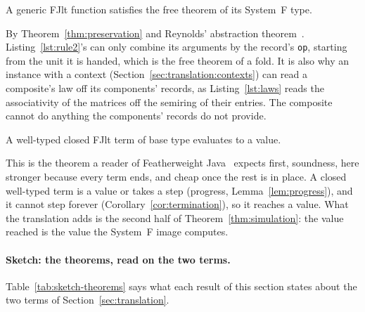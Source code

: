 \begin{corollary}[Parametricity]
\label{cor:parametricity}
A generic FJlt function satisfies the free theorem of its System~F type.
\end{corollary}

By Theorem~\ref{thm:preservation} and Reynolds' abstraction theorem~\cite{reynolds1983types,wadler1989theorems}.
Listing~\ref{lst:rule2}'s  can only combine its arguments by the record's \texttt{op}, starting from the unit it is handed, which is the free theorem of a fold.
It is also why an instance with a context (Section~\ref{sec:translation:contexts}) can read a composite's law off its components' records, as Listing~\ref{lst:laws} reads the associativity of the matrices off the semiring of their entries.
The composite cannot do anything the components' records do not provide.

\begin{corollary}
\label{cor:soundness}
A well-typed closed FJlt term of base type evaluates to a value.
\end{corollary}

This is the theorem a reader of Featherweight Java~\cite{igarashi2001featherweight} expects first, soundness, here stronger because every term ends, and cheap once the rest is in place.
A closed well-typed term is a value or takes a step (progress, Lemma~\ref{lem:progress}), and it cannot step forever (Corollary~\ref{cor:termination}), so it reaches a value.
What the translation adds is the second half of Theorem~\ref{thm:simulation}: the value reached is the value the System~F image computes.

\paragraph{Sketch: the theorems, read on the two terms.}
Table~\ref{tab:sketch-theorems} says what each result of this section states about the two terms of Section~\ref{sec:translation}.

